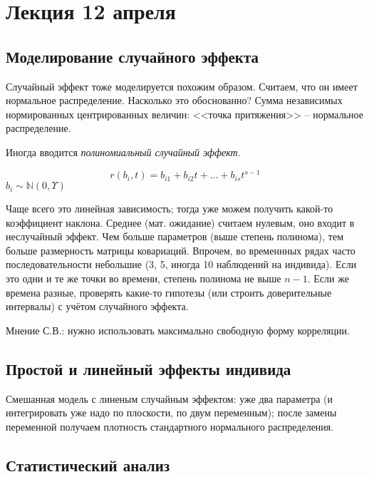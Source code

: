 \documentclass[main.tex]{subfiles}
\begin{document}
\section{Лекция 12 апреля}

\subsection{Моделирование случайного эффекта}

Случайный эффект тоже моделируется похожим образом.
Считаем, что он имеет нормальное распределение.
Насколько это обоснованно?
Сумма независимых нормированных центрированных величин: <<точка притяжения>> -- нормальное распределение.

Иногда вводится \emph{полиномиальный случайный эффект}.

\[ r(b_i, t) = b_{i1} + b_{i2} t + \dots + b_{is} t^{s-1}\]
$ b_i \sim \mathds N(0, \Upsilon) $

Чаще всего это линейная зависимость; тогда уже можем получить какой-то коэффициент наклона.
Среднее (мат. ожидание) считаем нулевым, оно входит в неслучайный эффект.
Чем больше параметров (выше степень полинома), тем больше размерность матрицы ковариаций.
Впрочем, во временнных рядах часто последовательности небольшие (3, 5, иногда 10 наблюдений на индивида).
Если это одни и те же точки во времени, степень полинома не выше $ n-1 $.
Если же времена разные, проверять какие-то гипотезы (или строить доверительные интервалы) с учётом случайного эффекта.

\begin{leftbar}
	Мнение С.В.: нужно использовать максимально свободную форму корреляции.
\end{leftbar}


\subsection{ Простой и линейный эффекты индивида }


Смешанная модель с линеным случайным эффектом: уже два параметра (и интегрировать уже надо по плоскости, по двум переменным); после замены переменной получаем плотность стандартного нормального распределения.

\subsection{ Статистический анализ }
\end{document}
